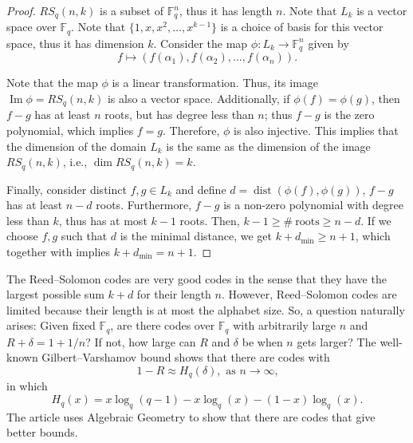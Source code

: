 \documentclass[11pt, oneside]{amsart}
\theoremstyle{definition}
\theoremstyle{remark}
\numberwithin{equation}{section}
\DeclareMathOperator{\dist}{dist}
\DeclareMathOperator{\Ima}{Im}
\DeclareMathOperator{\dimension}{dim}
\begin{document}
\begin{proof}
	$RS_q(n, k)$ is a subset of $\mathbb{F}_q^n$, thus it has length $n$.  
	Note that $ L_k$ is a vector space over $\mathbb{F}_q$.
	Note that $\{1, x, x^2, \dots, x^{k-1}\}$ is a choice of basis for this vector space, thus it has dimension $k$.
	Consider the map $\phi:  L_k \to \mathbb{F}_q^n$ given by 
	\begin{equation}
		f \mapsto (f(\alpha_1), f(\alpha_2), \dots, f(\alpha_n)).
	\end{equation}

	Note that the map $\phi$ is a linear transformation.
	Thus, its image $\Ima \phi = RS_q(n, k)$ is also a vector space.  
	Additionally, if $\phi(f) = \phi(g)$, then $f - g$ has at least $n$ roots, but has degree less than $n$; thus $f - g$ is the zero polynomial, which implies $f = g$.
	Therefore, $\phi$ is also injective.
	This implies that the dimension of the domain $ L_k$ is the same as the dimension of the image $RS_q(n, k)$, i.e.,  $\dimension RS_q(n, k) = k$.
	
	Finally, consider distinct $f, g \in  L_k$ and define $d = \dist(\phi(f), \phi(g))$, $f - g$ has at least $n - d$ roots.
	Furthermore, $f - g$ is a non-zero polynomial with degree less than $k$, thus has at most $k - 1$ roots.
	Then,  $ k - 1 \ge \#\ \text{roots} \ge n - d$.
	If we choose $f, g$ such that $d$ is the minimal distance, we get $k + d_{\mathrm{min}} \ge n + 1$, which together with  implies $k + d_\text{min} = n + 1$.
\end{proof}

The Reed--Solomon codes are very good codes in the sense that they have the largest possible sum $k + d$ for their length $n$.
However, Reed--Solomon codes are limited because their length is at most the alphabet size.
So, a question naturally arises: Given fixed $\mathbb{F}_q$, are there codes over $\mathbb{F}_q$ with arbitrarily large $n$ and $R + \delta = 1 + 1/n$?
If not, how large can $R$ and $\delta$ be when $n$ gets larger?
The well-known Gilbert--Varshamov bound shows that there are codes with 
\begin{equation}
	1 - R \approx H_q(\delta), \text{ as $n \to \infty$,}
\end{equation}
in which
\begin{equation}
	H_q(x) = x \log_q(q-1) - x\log_q(x) - (1-x)\log_q(x).
\end{equation}
The article \cite{TVZ82} uses Algebraic Geometry to show that there are codes that give better bounds.
\end{document}
